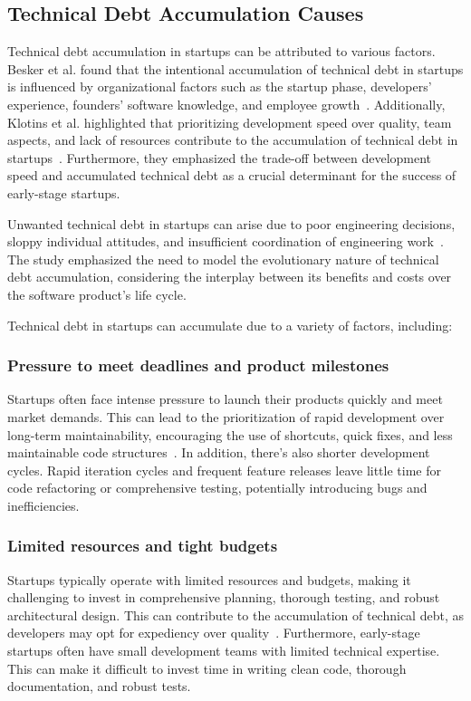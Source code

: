 \subsection{Technical Debt Accumulation Causes}
Technical debt accumulation in startups can be attributed to various factors. Besker et al. found that the intentional accumulation of technical debt in startups is influenced by organizational factors such as the startup phase, developers' experience, founders' software knowledge, and employee growth~\cite{Besker2018}. Additionally, Klotins et al. highlighted that prioritizing development speed over quality, team aspects, and lack of resources contribute to the accumulation of technical debt in startups~\cite{Klotins:2018:ETD}. Furthermore, they emphasized the trade-off between development speed and accumulated technical debt as a crucial determinant for the success of early-stage startups.

Unwanted technical debt in startups can arise due to poor engineering decisions, sloppy individual attitudes, and insufficient coordination of engineering work~\cite{Klotins882019}. The study emphasized the need to model the evolutionary nature of technical debt accumulation, considering the interplay between its benefits and costs over the software product's life cycle.

Technical debt in startups can accumulate due to a variety of factors, including:
\subsubsection{Pressure to meet deadlines and product milestones}
Startups often face intense pressure to launch their products quickly and meet market demands. This can lead to the prioritization of rapid development over long-term maintainability, encouraging the use of shortcuts, quick fixes, and less maintainable code structures~\cite{Klotins:2018:ETD,Qualityv77:online}. In addition, there's also shorter development cycles. Rapid iteration cycles and frequent feature releases leave little time for code refactoring or comprehensive testing, potentially introducing bugs and inefficiencies.

\subsubsection{Limited resources and tight budgets}
Startups typically operate with limited resources and budgets, making it challenging to invest in comprehensive planning, thorough testing, and robust architectural design. This can contribute to the accumulation of technical debt, as developers may opt for expediency over quality~\cite{FowlerBottlenecks,Balancin62:online}. Furthermore, early-stage startups often have small development teams with limited technical expertise. This can make it difficult to invest time in writing clean code, thorough documentation, and robust tests.

